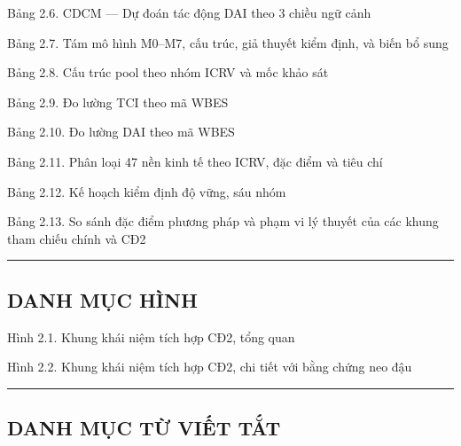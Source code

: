\documentclass[12pt,a4paper]{article}
\begin{document}
Bảng 2.6. CDCM --- Dự đoán tác động DAI theo 3 chiều ngữ cảnh

Bảng 2.7. Tám mô hình M0--M7, cấu trúc, giả thuyết kiểm định, và biến bổ
sung

Bảng 2.8. Cấu trúc pool theo nhóm ICRV và mốc khảo sát

Bảng 2.9. Đo lường TCI theo mã WBES

Bảng 2.10. Đo lường DAI theo mã WBES

Bảng 2.11. Phân loại 47 nền kinh tế theo ICRV, đặc điểm và tiêu chí

Bảng 2.12. Kế hoạch kiểm định độ vững, sáu nhóm

Bảng 2.13. So sánh đặc điểm phương pháp và phạm vi lý thuyết của các
khung tham chiếu chính và CĐ2

\begin{center}\rule{0.5\linewidth}{0.5pt}\end{center}

\hypertarget{danh-mux1ee5c-huxecnh}{%
\subsection{DANH MỤC HÌNH}\label{danh-mux1ee5c-huxecnh}}

Hình 2.1. Khung khái niệm tích hợp CĐ2, tổng quan

Hình 2.2. Khung khái niệm tích hợp CĐ2, chi tiết với bằng chứng neo đậu

\begin{center}\rule{0.5\linewidth}{0.5pt}\end{center}

\hypertarget{danh-mux1ee5c-tux1eeb-viux1ebft-tux1eaft}{%
\subsection{DANH MỤC TỪ VIẾT
TẮT}\label{danh-mux1ee5c-tux1eeb-viux1ebft-tux1eaft}}
\end{document}
